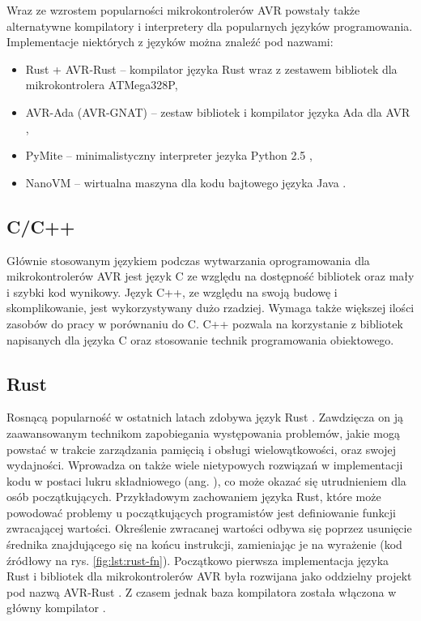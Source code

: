 Wraz ze wzrostem popularności mikrokontrolerów AVR powstały także alternatywne kompilatory i interpretery dla popularnych języków programowania. Implementacje niektórych z języków można znaleźć pod nazwami:
\begin{itemize}
\item Rust + AVR-Rust -- kompilator języka Rust wraz z zestawem bibliotek dla mikrokontrolera ATMega328P\cite{1IntroductionAVRRust},
\item AVR-Ada (AVR-GNAT) -- zestaw bibliotek i kompilator języka Ada dla AVR \cite{AVRAdaWikiHome},
\item PyMite -- minimalistyczny interpreter jezyka Python 2.5 \cite{PyMitePythonWiki},
\item NanoVM -- wirtualna maszyna dla kodu bajtowego języka Java \cite{harbaumHarbaumNanoVM2025}.
\end{itemize}
\subsection{C/C++}
Głównie stosowanym językiem podczas wytwarzania oprogramowania dla mikrokontrolerów AVR jest język C ze względu na dostępność bibliotek oraz mały i szybki kod wynikowy. Język C++, ze względu na swoją budowę i skomplikowanie, jest wykorzystywany dużo rzadziej. Wymaga także większej ilości zasobów do pracy w porównaniu do C. C++ pozwala na korzystanie z bibliotek napisanych dla języka C oraz stosowanie technik programowania obiektowego.
\subsection{Rust}
Rosnącą popularność w ostatnich latach zdobywa język Rust \cite{gasibaThinkThisBeginning2023}. Zawdzięcza on ją zaawansowanym technikom zapobiegania występowania problemów, jakie mogą powstać w trakcie zarządzania pamięcią i obsługi wielowątkowości, oraz swojej wydajności. Wprowadza on także wiele nietypowych rozwiązań w implementacji kodu w postaci lukru składniowego (ang. ), co może okazać się utrudnieniem dla osób początkujących. Przykładowym zachowaniem języka Rust, które może powodować problemy u początkujących programistów jest definiowanie funkcji zwracającej wartości. Określenie zwracanej wartości odbywa się poprzez usunięcie średnika znajdującego się na końcu instrukcji, zamieniając je na wyrażenie\cite{rustFunctions} (kod źródłowy na rys. \ref{fig:lst:rust-fn}). Początkowo pierwsza implementacja języka Rust i bibliotek dla mikrokontrolerów AVR była rozwijana jako oddzielny projekt pod nazwą AVR-Rust \cite{AvrrustRustlegacyforkDeprecated}. Z czasem jednak baza kompilatora została włączona w główny kompilator \cite{RFCMergingAvrrust}.

